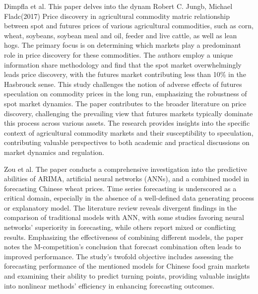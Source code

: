         Dimpfla et al. \cite{dimpfl2017} This paper delves into the dynam Robert C. Jungb, Michael Fladc(2017) Price discovery in agricultural commodity matric relationship between spot and futures prices of various agricultural commodities, such as corn, wheat, soybeans, soybean meal and oil, feeder and live cattle, as well as lean hogs. The primary focus is on determining which markets play a predominant role in price discovery for these commodities. The authors employ a unique information share methodology and find that the spot market overwhelmingly leads price discovery, with the futures market contributing less than 10\% in the Hasbrouck sense. This study challenges the notion of adverse effects of futures speculation on commodity prices in the long run, emphasizing the robustness of spot market dynamics. The paper contributes to the broader literature on price discovery, challenging the prevailing view that futures markets typically dominate this process across various assets. The research provides insights into the specific context of agricultural commodity markets and their susceptibility to speculation, contributing valuable perspectives to both academic and practical discussions on market dynamics and regulation.
        
        Zou et al. \cite{zou2007} The paper conducts a comprehensive investigation into the predictive abilities of ARIMA, artificial neural networks (ANNs), and a combined model in forecasting Chinese wheat prices. Time series forecasting is underscored as a critical domain, especially in the absence of a well-defined data generating process or explanatory model. The literature review reveals divergent findings in the comparison of traditional models with ANN, with some studies favoring neural networks' superiority in forecasting, while others report mixed or conflicting results. Emphasizing the effectiveness of combining different models, the paper notes the M-competition's conclusion that forecast combination often leads to improved performance. The study's twofold objective includes assessing the forecasting performance of the mentioned models for Chinese food grain markets and examining their ability to predict turning points, providing valuable insights into nonlinear methods' efficiency in enhancing forecasting outcomes.
        
